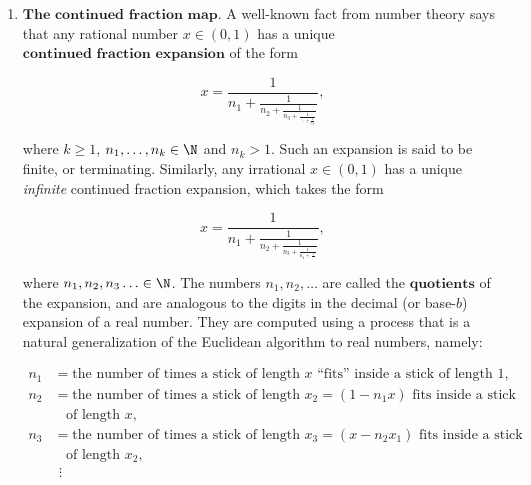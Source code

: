 \begin{enumerate}[label=\arabic*.]
\[
D(x) = 2x\textrm{ mod }1 = \begin{cases} 2x&x<\tfrac12, \\ 2x-1&x\ge\tfrac12. \end{cases}
\]

\begin{lem}
$D$ preserves Lebesgue measure.
\end{lem}

\begin{proof}
If $A\subset [0,1]$ is a Borel set, then

\[
\operatorname{Leb}(D^{-1}(A)) =
\operatorname{Leb}\left(\tfrac12 A \sqcup \left(\tfrac12 A+\tfrac12\right) \right)
= \tfrac12 \operatorname{Leb}(A)
+ \tfrac12 \operatorname{Leb}(\tfrac12+A) =
\operatorname{Leb}(A).
\]

\end{proof}

\noindent We have seen before that the measure space $[0,1]$
with Lebesgue measure is isomorphic to the product
space of an infinite sequence of i.i.d.\ unbiased coin
tosses. It is easy to see that under this isomorphism,
the doubling map translates to the shift map $S$ of
the Bernoulli sequence. So, the doubling map is really
a disguised version of the Bernoulli shift associated
with i.i.d.\ unbiased coin tosses.

\item $\textbf{The continued fraction map.}$ A well-known
fact from number theory says that any rational number
$x\in (0,1)$ has a unique
$\textbf{continued fraction expansion}$ of the form

\[
x = \frac{1}{n_1+\frac{1}{n_2+\frac{1}{n_3+\frac{1}{\ddots+\frac{1}{n_k}}}}},
\]

\noindent where $k\ge 1$, $n_1,\ldots,n_k\in \N$ and $n_k>1$.
Such an expansion is said to be finite, or
terminating. Similarly, any irrational $x\in(0,1)$
has a unique \emph{infinite} continued fraction expansion,
which takes the form

\[
x = \frac{1}{n_1+\frac{1}{n_2+\frac{1}{n_3+\frac{1}{n_4+\frac{1}{\ldots}}}}},
\]

\noindent where $n_1,n_2,n_3\ldots \in \N$. The numbers
$n_1,n_2,\ldots$ are called the $\textbf{quotients}$
of the expansion, and are analogous to the digits in
the decimal (or base-$b$) expansion of a real number.
They are computed using a process that is a natural
generalization of the Euclidean algorithm to real
numbers, namely:

\begin{align*}
n_1 &= \textrm{the number of times a stick of length $x$ ``fits'' inside a stick of length $1$}, \\
n_2 &= \textrm{the number of times a stick of length $x_2=(1-n_1x)$ fits inside a stick}\\ &\ \ \ \ \textrm{of length $x$},
\\
n_3 &= \textrm{the number of times a stick of length $x_3=(x-n_2x_1)$ fits inside a stick} \\
&\ \ \ \ \textrm{of length $x_2$}, \\
& \ \,\vdots
\end{align*}


\end{enumerate}
